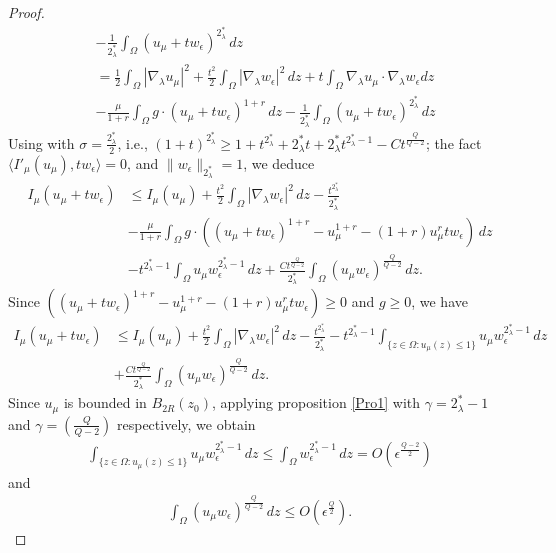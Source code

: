 \documentclass[12pt, notitlepage]{article}
\begin{document}
{\begin{proof}
\begin{align}
    &-\frac{1}{2^*_\lambda}\int_\Omega  (u_\mu+tw_\epsilon)^{2^*_\lambda}\, dz\nonumber\\
    &=\frac{1}{2}\int_\Omega|\nabla_\lambda u_\mu|^2+\frac{t^2}{2}\int_\Omega|\nabla_\lambda w_\epsilon|^2\, dz+t\int_\Omega \nabla_\lambda u_\mu\cdot \nabla_\lambda w_\epsilon dz\nonumber\\
    &-\frac{\mu}{1+r}\int_\Omega g\cdot (u_\mu+tw_\epsilon)^{1+r}\, dz
    -\frac{1}{2^*_\lambda}\int_\Omega  (u_\mu+tw_\epsilon)^{2^*_\lambda}\, dz
\end{align}
Using \cite[ Lemma 2.4]{Silva} with $\sigma=\frac{2^*_\lambda}{2}$, i.e., $(1+t)^{2^*_\lambda}\geq 1+t^{2^*_\lambda}+{2^*_\lambda}t+2^*_\lambda t^{2^*_\lambda-1}-Ct^\frac{Q}{Q-2}$; the fact $\langle I'_\mu(u_\mu),tw_\epsilon\rangle=0$, and $\|w_\epsilon\|_{2^*_\lambda}=1$, we deduce
\begin{align}
   I_\mu(u_\mu+tw_\epsilon)&\leq I_\mu(u_\mu)+\frac{t^2}{2}\int_\Omega|\nabla_\lambda w_\epsilon|^2\, dz-\frac{t^{2^*_\lambda}}{2^*_\lambda}\nonumber\\
    &-\frac{\mu}{1+r}\int_\Omega g\cdot\left ((u_\mu+tw_\epsilon)^{1+r}-u_\mu^{1+r}-(1+r)u_\mu^rtw_\epsilon\right )\, dz\nonumber\\
    &-t^{2^*_\lambda-1}\int_\Omega u_\mu w_\epsilon^{2^*_\lambda-1}\, dz+\frac{Ct^\frac{Q}{Q-2}}{2^*_\lambda}\int_\Omega (u_\mu w_\epsilon)^\frac{Q}{Q-2}\, dz.
\end{align}
Since $\left ((u_\mu+tw_\epsilon)^{1+r}-u_\mu^{1+r}-(1+r)u_\mu^rtw_\epsilon\right )\geq 0$ and $g\geq 0$, we have
\begin{align}\label{san}
    I_\mu(u_\mu+tw_\epsilon)&\leq  I_\mu(u_\mu)+\frac{t^2}{2}\int_\Omega|\nabla_\lambda w_\epsilon|^2\, dz-\frac{t^{2^*_\lambda}}{2^*_\lambda}-t^{2^*_\lambda-1}\int_{\{z\in\Omega: u_\mu(z)\leq 1\}} u_\mu w_\epsilon^{2^*_\lambda-1}\, dz\nonumber\\
    &+\frac{Ct^\frac{Q}{Q-2}}{2^*_\lambda}\int_\Omega (u_\mu w_\epsilon)^\frac{Q}{Q-2}\, dz.
\end{align}
 Since $u_\mu$ is bounded in $B_{2R}(z_0)$, applying proposition \ref{Pro1} with $\gamma=2^*_\lambda-1$ and $\gamma=\left (\frac{Q}{Q-2}\right )$ respectively, we obtain
\begin{align}\label{san2}
    \int_{\{z\in\Omega: u_\mu(z)\leq 1\}} u_\mu w_\epsilon^{2^*_\lambda-1}\, dz\leq\int_\Omega w_\epsilon^{2^*_\lambda-1}\, dz=O(\epsilon^\frac{Q-2}{2})
\end{align}
and
\begin{align}\label{san3}
    \int_\Omega (u_\mu w_\epsilon)^\frac{Q}{Q-2}\, dz\leq O(\epsilon^\frac{Q}{2}).

\end{align}
\end{proof}}
\end{document}
